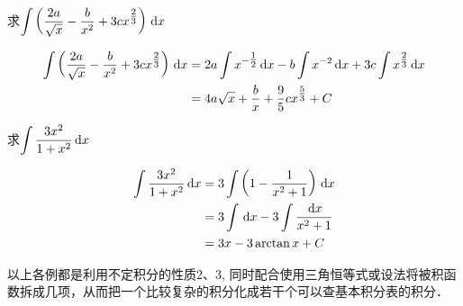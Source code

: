\begin{example}
求$\displaystyle\int \left(\dfrac{2a}{\sqrt{x}}-\dfrac{b}{x^2}+3cx^{\tfrac{2}{3}}\right)\,{\rm d} x$
\end{example}


\begin{solution}
    \[\begin{split}
        \displaystyle\int \left(\dfrac{2a}{\sqrt{x}}-\dfrac{b}{x^2}+3cx^{\tfrac{2}{3}}\right)\,{\rm d} x&=2a\int x^{-\tfrac{1}{2}}\,{\rm d} x-b\int x^{-2}\,{\rm d} x+3c\int x^{\tfrac{2}{3}}\,{\rm d} x\\
        &=4a\sqrt{x}+\dfrac{b}{x}+\dfrac{9}{5}cx^{\tfrac{5}{3}}+C
    \end{split}\]
\end{solution}

\begin{example}
    求$\displaystyle\int \dfrac{3x^2}{1+x^2}\,{\rm d} x$
\end{example}

\begin{solution}
\[\begin{split}
    \displaystyle\int \dfrac{3x^2}{1+x^2}\,{\rm d} x&=3\int \left(1-\dfrac{1}{x^2+1}\right)\,{\rm d} x\\
    &=3\int \,{\rm d} x-3\int \dfrac{\,{\rm d} x}{x^2+1}\\
    &=3x-3\arctan x+C
\end{split}\]
\end{solution}

以上各例都是利用不定积分的性质2、3, 同时配合使用三角恒等式或设法将被积函数拆成几项，从而把一个比较复杂的积分化成若干个可以查基本积分表的积分．

